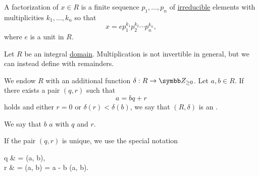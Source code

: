 \begin{definition}\label{def:factorization_in_ring}
  A factorization of \( x \in R \) is a finite sequence \( p_1, \ldots, p_n \) of \hyperref[def:irreducible_ring_element]{irreducible} elements with multiplicities \( k_1, \ldots, k_n \) so that
  \begin{equation*}
    x = e p_1^{k_1} p_2^{k_2} \cdots p_n^{k_n},
  \end{equation*}
  where \( e \) is a unit in \( R \).
\end{definition}

\begin{definition}\label{def:euclidean_domain}
  Let \( R \) be an integral \hyperref[def:semiring/integral_domain]{domain}. Multiplication is not invertible in general, but we can instead define  with remainders.

  We endow \( R \) with an additional function \( \delta: R \to \BZ_{\geq 0} \). Let \( a, b \in R \). If there exists a pair \( (q, r) \) such that
  \begin{equation*}
    a = bq + r
  \end{equation*}
  holds and either \( r = 0 \) or \( \delta(r) < \delta(b) \), we say that \( (R, \delta) \) is an .

  We say that \( b \)  \( a \) with  \( q \) and  \( r \).

  If the pair \( (q, r) \) is unique, we use the special notation
  \begin{BreakableAlign*}
    q & = \Quot(a, b),                    \\
    r & = \Rem(a, b) = a - b \Quot(a, b).
  \end{BreakableAlign*}
\end{definition}

